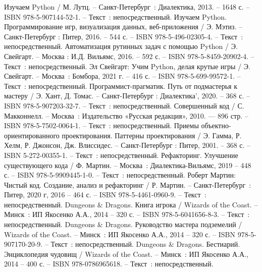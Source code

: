 
\begin{thebibliography}{9}

     Изучаем Python / М. Лутц. – Санкт-Петербург~: Диалектика, 2013. – 1648 с. – ISBN 978-5-907144-52-1. – Текст~: непосредственный.
     Изучаем Python. Программирование игр, визуализация данных, веб-приложения / Э. Мэтиз. – Санкт-Петербург : Питер, 2016. – 544 с. – ISBN 978-5-496-02305-4. – Текст~: непосредственный.
     Автоматизация рутинных задач с помощью Python / Э. Свейгарт. – Москва : И.Д. Вильямс, 2016. – 592 с. – ISBN 978-5-8459-20902-4. – Текст~: непосредственный.
    	Эл Свейгарт: Учим Python, делая крутые игры / Э. Свейгарт. – Москва~:  Бомбора, 2021 г. – 416 с. – ISBN 978-5-699-99572-1. – Текст~: непосредственный.
		Программист-прагматик. Путь от подмастерья к мастеру  / Э. Хант, Д. Томас. – Санкт-Петербург : Диалектика', 2020. – 368 с. – ISBN 978-5-907203-32-7. – Текст~: непосредственный.
		Совершенный код / С. Макконнелл. – Москва~: Издательство «Русская редакция», 2010. — 896 стр. – ISBN 978-5-7502-0064-1. – Текст~: непосредственный.
		Приемы объектно-ориентированного проектирования. Паттерны проектирования / Э. Гамма, Р. Хелм, Р. Джонсон, Дж. Влиссидес. – Санкт-Петербург : Питер, 2001. – 368 с. – ISBN 5-272-00355-1. – Текст~: непосредственный.
		Рефакторинг. Улучшение существующего кода / Ф. Мартин. – Москва~: Диалектика-Вильямс, 2019 – 448 с. – ISBN 978-5-9909445-1-0. – Текст~: непосредственный.
		Роберт Мартин: Чистый код. Создание, анализ и рефакторинг / Р. Мартин. – Санкт-Петербург~: Питер, 2020 г, 2016 – 464 с. – ISBN 978-5-4461-0960-9. – Текст~: непосредственный.    
		Dungeons \& Dragons. Книга игрока / Wizards of the Coast. – Минск~: ИП Якосенко А.А., 2014 – 320 с. – ISBN 978-5-6041656-8-3. – Текст~: непосредственный.    
		Dungeons \& Dragons. Руководство мастера подземелий /  Wizards of the Coast. – Минск~: ИП Якосенко А.А., 2014 – 320 с. – ISBN 978-5-907170-20-9. – Текст~: непосредственный.    
		Dungeons \& Dragons. Бестиарий. Энциклопедия чудовищ / Wizards of the Coast. – Минск~: ИП Якосенко А.А., 2014 – 400 с. – ISBN 978-0786965618. – Текст~: непосредственный.
\end{thebibliography}

